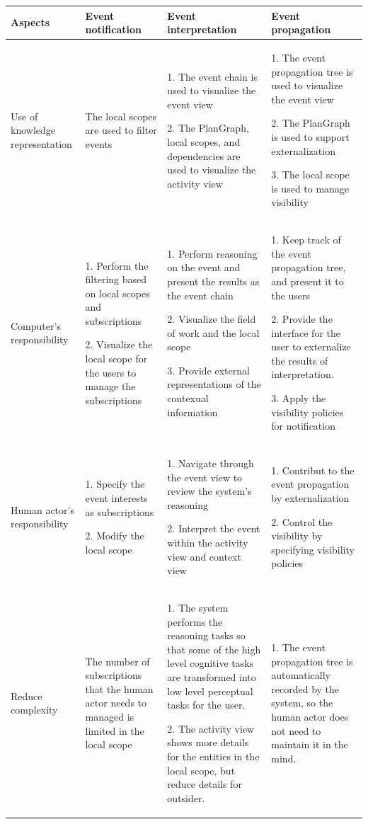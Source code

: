 {\footnotesize
\begin{longtable}{>{\raggedright}p{0.8in}>{\raggedright}p{1.5in}>{\raggedright}p{1.5in}>{\raggedright}p{1.7in}}
\toprule 
\textbf{Aspects} & \textbf{Event notification} & \textbf{Event interpretation} & \textbf{Event propagation}\tabularnewline
\midrule 
Use of knowledge representation & The local scopes are used to filter events  & 1. The event chain is used to visualize the event view

2. The PlanGraph, local scopes, and dependencies are used to visualize
the activity view & 1. The event propagation tree is used to visualize the event view

2. The PlanGraph is used to support externalization

3. The local scope is used to manage visibility\tabularnewline
\midrule 
Computer's responsibility & 1. Perform the filtering based on local scopes and subscriptions

2. Visualize the local scope for the users to manage the subscriptions & 1. Perform reasoning on the event and present the results as the event
chain

2. Visualize the field of work and the local scope

3. Provide external representations of the contexual information & 1. Keep track of the event propagation tree, and present it to the
users

2. Provide the interface for the user to externalize the results of
interpretation.

3. Apply the visibility policies for notification\tabularnewline
\midrule 
Human actor's responsibility & 1. Specify the event interests as subscriptions 

2. Modify the local scope & 1. Navigate through the event view to review the system's reasoning

2. Interpret the event within the activity view and context view & 1. Contribut to the event propagation by externalization

2. Control the visibility by specifying visibility policies\tabularnewline
\midrule 
Reduce complexity & The number of subscriptions that the human actor needs to managed
is limited in the local scope & 1. The system performs the reasoning tasks so that some of the high
level cognitive tasks are transformed into low level perceptual tasks
for the user.

2. The activity view shows more details for the entities in the local
scope, but reduce details for outsider. & 1. The event propagation tree is automatically recorded by the system,
so the human actor does not need to maintain it in the mind.


\end{longtable}}
